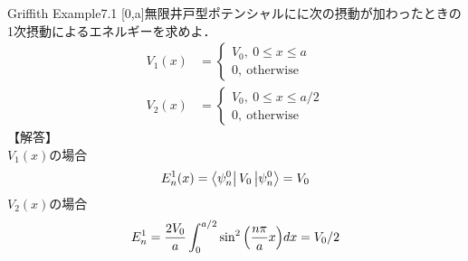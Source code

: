 \documentclass{standalone}
\begin{document}
  \begin{myex}{}{}Griffith Example7.1
    [0,a]無限井戸型ポテンシャルにに次の摂動が加わったときの1次摂動によるエネルギーを求めよ．
    \begin{align}
      V_1(x)&=
      \begin{cases}
      V_0,\ 0\le x\le a\\
      0,\ \mathrm{otherwise}
      \end{cases}\\
      V_2(x)&=
      \begin{cases}
      V_0,\ 0\le x \le a/2\\
      0,\ \mathrm{otherwise}
      \end{cases}
    \end{align}
    【解答】\\
    $V_1(x)$の場合
    \begin{equation}
      E_n^1(x)=\bra{\psi_n^0}V_0\ket{\psi_n^0}=V_0
    \end{equation}
    $V_2(x)$の場合
    \begin{equation}
      E_n^1=\frac{2V_0}{a}\int_{0}^{a/2}\sin^2\qty(\frac{n\pi}{a}x)dx=V_0/2
    \end{equation}
  \end{myex}
\end{document}
